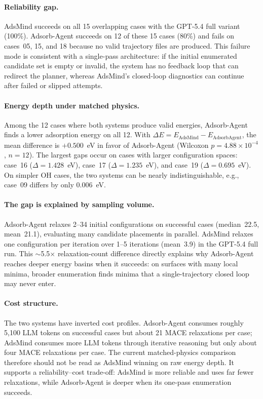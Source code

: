 \paragraph{Reliability gap.}
AdsMind succeeds on all 15 overlapping cases with the GPT-5.4 full variant (100\%).
Adsorb-Agent succeeds on 12 of these 15 cases (80\%) and fails on cases~05, 15, and 18 because no valid trajectory files are produced.
This failure mode is consistent with a single-pass architecture: if the initial enumerated candidate set is empty or invalid, the system has no feedback loop that can redirect the planner, whereas AdsMind's closed-loop diagnostics can continue after failed or slipped attempts.

\paragraph{Energy depth under matched physics.}
Among the 12 cases where both systems produce valid energies, Adsorb-Agent finds a lower adsorption energy on all 12.
With $\Delta E = E_{\mathrm{AdsMind}} - E_{\mathrm{AdsorbAgent}}$, the mean difference is $+0.500$~eV in favor of Adsorb-Agent (Wilcoxon $p = 4.88 \times 10^{-4}$, $n = 12$).
The largest gaps occur on cases with larger configuration spaces: case~16 ($\Delta = 1.428$~eV), case~17 ($\Delta = 1.235$~eV), and case~19 ($\Delta = 0.695$~eV).
On simpler OH cases, the two systems can be nearly indistinguishable, e.g., case~09 differs by only 0.006~eV.

\paragraph{The gap is explained by sampling volume.}
Adsorb-Agent relaxes 2--34 initial configurations on successful cases (median~22.5, mean~21.1), evaluating many candidate placements in parallel.
AdsMind relaxes one configuration per iteration over 1--5 iterations (mean~3.9) in the GPT-5.4 full run.
This $\sim$5.5$\times$ relaxation-count difference directly explains why Adsorb-Agent reaches deeper energy basins when it succeeds: on surfaces with many local minima, broader enumeration finds minima that a single-trajectory closed loop may never enter.

\paragraph{Cost structure.}
The two systems have inverted cost profiles.
Adsorb-Agent consumes roughly 5{,}100 LLM tokens on successful cases but about 21 MACE relaxations per case; AdsMind consumes more LLM tokens through iterative reasoning but only about four MACE relaxations per case.
The current matched-physics comparison therefore should not be read as AdsMind winning on raw energy depth.
It supports a reliability--cost trade-off: AdsMind is more reliable and uses far fewer relaxations, while Adsorb-Agent is deeper when its one-pass enumeration succeeds.

